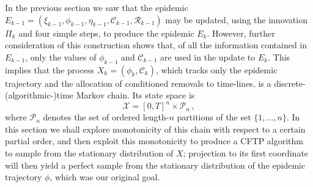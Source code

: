 \documentclass[]{article}
\newcommand{\Conditioned}{\mathcal{C}}
\newcommand{\Epidemic}{E}%
\newcommand{\Removals}{\mathcal{R}}
\newcommand{\Epi}{X}
\begin{document}
In the previous section we saw that the epidemic \(\Epidemic_{k-1} = (\xi_{k-1}, \phi_{k-1}, \eta_{k-1}, \Conditioned_{k-1}, \Removals_{k-1})\) may be updated, using the innovation \(\Pi_k\) and four simple steps, to produce the epidemic \(\Epidemic_k\). However, further consideration of this construction shows that, of all the information contained in \(\Epidemic_{k-1}\), only the values of \(\phi_{k-1}\) and \(\Conditioned_{k-1}\) are used in the update to \(\Epidemic_k\). This implies that the process \(\Epi_k = (\phi_k, \Conditioned_k)\), which tracks only the epidemic trajectory and the allocation of conditioned removals to time-lines, is a discrete-(algorithmic-)time Markov chain. Its state space is 
\[\mathcal{X} = [0,T]^n \times \mathcal{P}_n\,,\]
where \(\mathcal{P}_n\) denotes the set of ordered length-\(n\) partitions of the set \(\{1,\dots,n\}\). In this section we shall explore monotonicity of this chain with respect to a certain partial order, and then exploit this monotonicity to produce a CFTP algorithm to sample from the stationary distribution of \(X\); projection to its first coordinate will then yield a perfect sample from the stationary distribution of the epidemic trajectory \(\phi\), which was our original goal.
\end{document}
